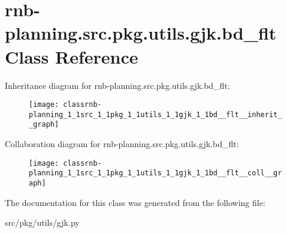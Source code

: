 \hypertarget{classrnb-planning_1_1src_1_1pkg_1_1utils_1_1gjk_1_1bd__flt}{}\section{rnb-\/planning.src.\+pkg.\+utils.\+gjk.\+bd\+\_\+flt Class Reference}
\label{classrnb-planning_1_1src_1_1pkg_1_1utils_1_1gjk_1_1bd__flt}


Inheritance diagram for rnb-\/planning.src.\+pkg.\+utils.\+gjk.\+bd\+\_\+flt\+:\nopagebreak
\begin{figure}[H]
\begin{center}
\leavevmode
\texttt{[image: classrnb-planning\_1\_1src\_1\_1pkg\_1\_1utils\_1\_1gjk\_1\_1bd\_\_flt\_\_inherit\_\_graph]}
\end{center}
\end{figure}


Collaboration diagram for rnb-\/planning.src.\+pkg.\+utils.\+gjk.\+bd\+\_\+flt\+:\nopagebreak
\begin{figure}[H]
\begin{center}
\leavevmode
\texttt{[image: classrnb-planning\_1\_1src\_1\_1pkg\_1\_1utils\_1\_1gjk\_1\_1bd\_\_flt\_\_coll\_\_graph]}
\end{center}
\end{figure}


The documentation for this class was generated from the following file\+:\begin{DoxyCompactItemize}
\item 
src/pkg/utils/gjk.\+py\end{DoxyCompactItemize}

